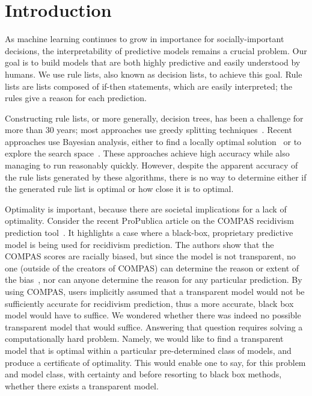%
%
%
%
%
%

\section{Introduction}

As machine learning continues to grow in importance for socially-important decisions, the interpretability of predictive models remains a crucial problem. Our goal is to build models that are both highly predictive and easily understood by humans. We use rule lists, also known as decision lists, to achieve this goal. Rule lists are lists composed of if-then statements, which are easily interpreted; the rules give a reason for each prediction.

Constructing rule lists, or more generally, decision trees, has been a challenge for more than
30 years; most approaches use greedy splitting techniques~\cite{Rivest87,Breiman84,Quinlan93}. 
%
Recent approaches use Bayesian analysis, either to find a locally optimal solution~\cite{Chipman:1998jh} or to explore the search space~\citep{LethamRuMcMa15, YangRuSe16}.
%
These approaches achieve high accuracy while also managing to run reasonably quickly. However, despite the apparent accuracy of the rule lists generated by these algorithms, there is no way to determine either if the generated rule list is optimal or how close it is to optimal.

Optimality is important, because there are societal implications for a lack of optimality.
%
Consider the recent ProPublica article on the COMPAS recidivism prediction tool~\citep{LarsonMaKiAn16}.
%
It highlights a case where a black-box, proprietary predictive model is being used for recidivism prediction.
%
The authors show that the COMPAS scores are racially biased, but since the model is not transparent, no one (outside of the creators of COMPAS) can determine the reason or extent of the bias~\citep{LarsonMaKiAn16}, nor can anyone determine the reason for any particular prediction.
%
By using COMPAS, users implicitly assumed that a transparent model
would not be sufficiently accurate for recidivism prediction,
thus a more accurate, black box model would have to suffice.
%
We wondered whether there was indeed no possible transparent model that would suffice.
%
Answering that question requires solving a computationally hard problem.
%
Namely, we would like to find a transparent model that is optimal
within a particular pre-determined class of models,
and produce a certificate of optimality.
%
This would enable one to say, for this problem and model class,
with certainty and before resorting to black box methods,
whether there exists a transparent model.

